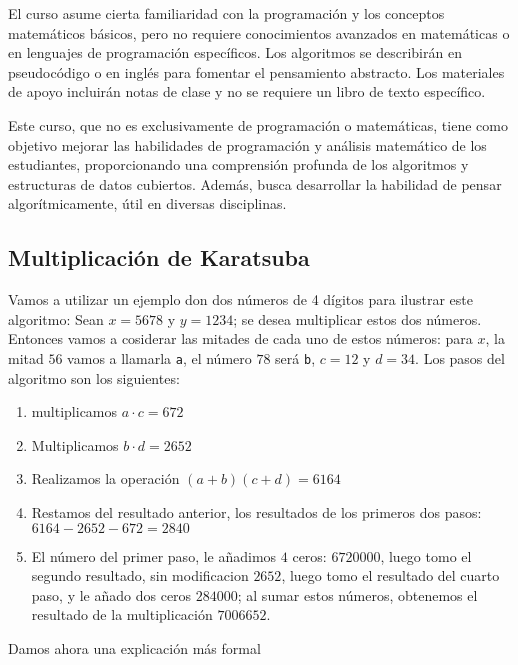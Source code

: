             El curso asume cierta familiaridad con la programación y los conceptos matemáticos básicos, pero no requiere conocimientos avanzados en matemáticas o en lenguajes de programación específicos. Los algoritmos se describirán en pseudocódigo o en inglés para fomentar el pensamiento abstracto. Los materiales de apoyo incluirán notas de clase y no se requiere un libro de texto específico.
                
            Este curso, que no es exclusivamente de programación o matemáticas, tiene como objetivo mejorar las habilidades de programación y análisis matemático de los estudiantes, proporcionando una comprensión profunda de los algoritmos y estructuras de datos cubiertos. Además, busca desarrollar la habilidad de pensar algorítmicamente, útil en diversas disciplinas.

            \subsection{Multiplicación de Karatsuba}

                Vamos a utilizar un ejemplo don dos números de 4 dígitos para ilustrar este algoritmo: Sean $x=5678$ y $y=1234$; se desea multiplicar estos dos números. Entonces vamos a cosiderar las mitades de cada uno de estos números: para $x$, la mitad $56$ vamos a llamarla \texttt{a}, el número $78$ será \texttt{b}, $c=12$ y $d=34$. Los pasos del algoritmo son los siguientes:
                
                \begin{enumerate}
                    \item multiplicamos $a \cdot c = 672$
                    \item Multiplicamos $b \cdot d = 2652$
                    \item Realizamos la operación $(a+b)(c+d) = 6164$
                    \item Restamos del resultado anterior, los resultados de los primeros dos pasos: $6164-2652-672 = 2840$
                    \item El número del primer paso, le añadimos $4$ ceros: $6720000$, luego tomo el segundo resultado, sin modificacion $2652$, luego tomo el resultado del cuarto paso, y le añado dos ceros $284000$; al sumar estos números, obtenemos el resultado de la multiplicación $7006652$.
                \end{enumerate}

                Damos ahora una explicación más formal


